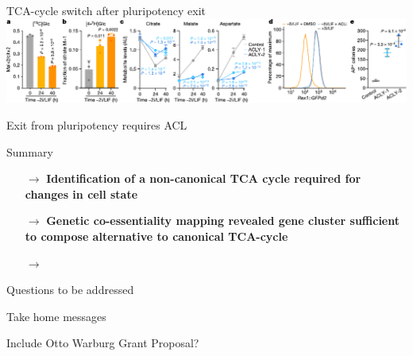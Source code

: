 \documentclass[10pt, aspectratio=169]{beamer}
\begin{document}
\begin{frame}{TCA-cycle switch after pluripotency exit}
\includegraphics[width=\textwidth]{figures/Arnold_2022_fig4.pdf}
\end{frame}

\begin{frame}{Exit from pluripotency requires ACL}

\end{frame}

\begin{frame}{Summary}
\begin{itemize}
    \item[$\rightarrow$] \textbf{Identification of a non-canonical TCA cycle required for changes in cell state} \\[0.3cm]
    \item[$\rightarrow$] \textbf{Genetic co-essentiality mapping revealed gene cluster sufficient to compose alternative to canonical TCA-cycle}
    \item[$\rightarrow$] \textbf{}
\end{itemize}
\end{frame}

\begin{frame}{Questions to be addressed}

\end{frame}

\begin{frame}{Take home messages}

Include Otto Warburg Grant Proposal?
\end{frame}
\end{document}
